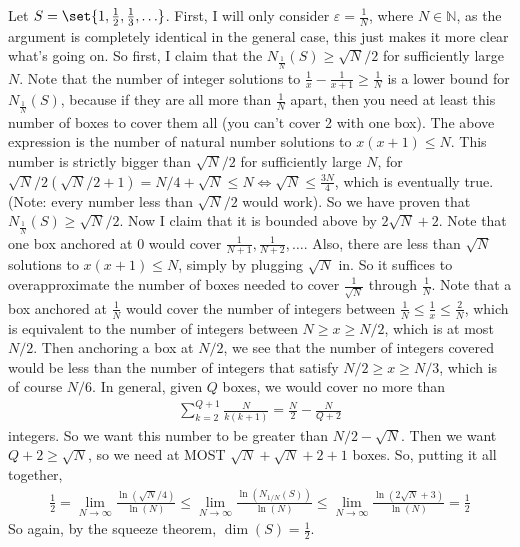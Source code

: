 \documentclass[12pt]{article}
\def\mbb#1{\mathbb{#1}}
\def\bN{\mbb{N}}
\theoremstyle{definition}
\theoremstyle{remark}
\newcommand{\ve}{\varepsilon}
\begin{document}
\begin{enumerate}[leftmargin=\labelsep]
\begin{enumerate}
				Let $S = \set{1, \frac12, \frac13, \ldots}$. First, I will only consider $\ve = \frac1N$, where $N \in \bN$, as the argument is completely identical in the general case, this just makes it more clear what's going on. So first, I claim that the $N_\frac1N(S) \geq \sqrt{N}/2$ for sufficiently large $N$. Note that the number of integer solutions to $\frac1x - \frac1{x+1} \geq \frac1N$ is a lower bound for $N_\frac1N(S)$, because if they are all more than $\frac1N$ apart, then you need at least this number of boxes to cover them all (you can't cover 2 with one box). The above expression is the number of natural number solutions to $x(x+1) \leq N$. This number is strictly bigger than $\sqrt{N}/2$ for sufficiently large $N$, for $\sqrt{N}/2 (\sqrt{N}/2 + 1) = N/4 + \sqrt{N} \leq N \iff \sqrt{N} \leq \frac{3N}{4}$, which is eventually true. (Note: every number less than $\sqrt{N}/2$ would work). So we have proven that $N_\frac1N(S) \geq \sqrt{N}/2$. Now I claim that it is bounded above by $2\sqrt{N} + 2$. Note that one box anchored at 0 would cover $\frac{1}{N+1}, \frac{1}{N+2}, \ldots$. Also, there are less than $\sqrt{N}$ solutions to $x(x+1) \leq N$, simply by plugging $\sqrt{N}$ in. So it suffices to overapproximate the number of boxes needed to cover $\frac{1}{\sqrt{N}}$ through $\frac{1}{N}$. Note that a box anchored at $\frac1N$ would cover the number of integers between $\frac1N \leq \frac1x \leq \frac2N$, which is equivalent to the number of integers between $N \geq x \geq N/2$, which is at most $N/2$. Then anchoring a box at $N/2$, we see that the number of integers covered would be less than the number of integers that satisfy $N/2 \geq x \geq N/3$, which is of course $N/6$. In general, given $Q$ boxes, we would cover no more than
					\begin{align*}
						\sum_{k=2}^{Q+1} \frac{N}{k(k+1)} = \frac N2 - \frac N{Q+2}
					\end{align*}
			integers. So we want this number to be greater than $N/2 - \sqrt N$. Then we want $Q+2 \geq \sqrt{N}$, so we need at MOST $\sqrt{N}+\sqrt{N}+2+1$ boxes. So, putting it all together,
				\begin{align*}
					\frac12 = \lim_{N \to \infty} \frac{\ln(\sqrt{N}/4)}{\ln(N)} \leq \lim_{N \to \infty} \frac{\ln(N_{1/N}(S))}{\ln(N)} \leq \lim_{N \to \infty} \frac{\ln(2\sqrt{N}+3)}{\ln(N)} = \frac12
				\end{align*}
			So again, by the squeeze theorem, $\dim(S) = \frac12$.
			\end{enumerate}
		\end{enumerate}
\end{document}
